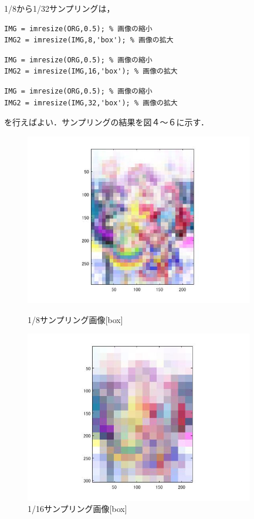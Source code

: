 \documentclass{jsarticle}
\begin{document}
1/8から1/32サンプリングは，

\begin{lstlisting}[basicstyle=\ttfamily\footnotesize, frame=single]
IMG = imresize(ORG,0.5); % 画像の縮小
IMG2 = imresize(IMG,8,'box'); % 画像の拡大
 \end{lstlisting}

\begin{lstlisting}[basicstyle=\ttfamily\footnotesize, frame=single]
IMG = imresize(ORG,0.5); % 画像の縮小
IMG2 = imresize(IMG,16,'box'); % 画像の拡大
 \end{lstlisting}

\begin{lstlisting}[basicstyle=\ttfamily\footnotesize, frame=single]
IMG = imresize(ORG,0.5); % 画像の縮小
IMG2 = imresize(IMG,32,'box'); % 画像の拡大
 \end{lstlisting}

を行えばよい．サンプリングの結果を図４～６に示す．

\begin{figure}[htbp]
 \begin{center}
  \includegraphics[width=10cm]{kadai1-3.jpg}
 \end{center}
 \caption{1/8サンプリング画像[box]}
 \begin{center}
  \includegraphics[width=10cm]{kadai1-4.jpg}
 \end{center}
 \caption{1/16サンプリング画像[box]}
\end{figure}
\end{document}
